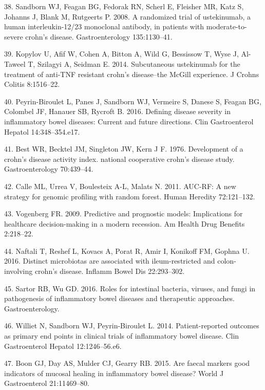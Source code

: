 \documentclass[12pt,]{article}
\begin{document}
\hypertarget{ref-sandborn_ust_2008}{}
38. Sandborn WJ, Feagan BG, Fedorak RN, Scherl E, Fleisher MR, Katz S,
Johanns J, Blank M, Rutgeerts P. 2008. A randomized trial of
ustekinumab, a human interleukin-12/23 monoclonal antibody, in patients
with moderate-to-severe crohn's disease. Gastroenterology 135:1130--41.

\hypertarget{ref-kopylov_ust_2014}{}
39. Kopylov U, Afif W, Cohen A, Bitton A, Wild G, Bessissow T, Wyse J,
Al-Taweel T, Szilagyi A, Seidman E. 2014. Subcutaneous ustekinumab for
the treatment of anti-TNF resistant crohn's disease--the McGill
experience. J Crohns Colitis 8:1516--22.

\hypertarget{ref-PB_CDAI_2016}{}
40. Peyrin-Biroulet L, Panes J, Sandborn WJ, Vermeire S, Danese S,
Feagan BG, Colombel JF, Hanauer SB, Rycroft B. 2016. Defining disease
severity in inflammatory bowel diseases: Current and future directions.
Clin Gastroenterol Hepatol 14:348--354.e17.

\hypertarget{ref-Best_CDAI_1976}{}
41. Best WR, Becktel JM, Singleton JW, Kern J F. 1976. Development of a
crohn's disease activity index. national cooperative crohn's disease
study. Gastroenterology 70:439--44.

\hypertarget{ref-calle_aucrf_2011}{}
42. Calle ML, Urrea V, Boulesteix A-L, Malats N. 2011. AUC-RF: A new
strategy for genomic profiling with random forest. Human Heredity
72:121--132.

\hypertarget{ref-Vogenberg_progmods_2009}{}
43. Vogenberg FR. 2009. Predictive and prognostic models: Implications
for healthcare decision-making in a modern recession. Am Health Drug
Benefits 2:218--22.

\hypertarget{ref-naftali_tissinvol_2016}{}
44. Naftali T, Reshef L, Kovacs A, Porat R, Amir I, Konikoff FM, Gophna
U. 2016. Distinct microbiotas are associated with ileum-restricted and
colon-involving crohn's disease. Inflamm Bowel Dis 22:293--302.

\hypertarget{ref-sartor_microbesIBD_2016}{}
45. Sartor RB, Wu GD. 2016. Roles for intestinal bacteria, viruses, and
fungi in pathogenesis of inflammatory bowel diseases and therapeutic
approaches. Gastroenterology.

\hypertarget{ref-Williet2014_PROs}{}
46. Williet N, Sandborn WJ, Peyrin-Biroulet L. 2014. Patient-reported
outcomes as primary end points in clinical trials of inflammatory bowel
disease. Clin Gastroenterol Hepatol 12:1246--56.e6.

\hypertarget{ref-boon_fmarkers_2015}{}
47. Boon GJ, Day AS, Mulder CJ, Gearry RB. 2015. Are faecal markers good
indicators of mucosal healing in inflammatory bowel disease? World J
Gastroenterol 21:11469--80.
\end{document}

